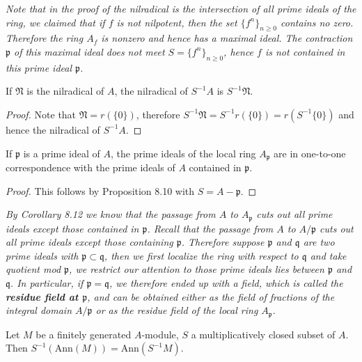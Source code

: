 \begin{note}\em
Note that in the proof of the nilradical is the intersection of all prime ideals of the ring, we claimed that if $f$ is not nilpotent, then the set $\{f^n\}_{n\ge 0}$ contains no zero. Therefore the ring $A_f$ is nonzero and hence has a maximal ideal. The contraction $\mathfrak{p}$ of this maximal ideal does not meet $S=\{f^n\}_{n\ge 0}$, hence $f$ is not contained in this prime ideal $\mathfrak{p}$.
\end{note}
\begin{corollary}
If $\mathfrak{N}$ is the nilradical of $A$, the nilradical of $S^{-1}A$ is $S^{-1}\mathfrak{N}$.
\end{corollary}
\begin{proof}
Note that $\mathfrak{N}=r(\{0\})$, therefore $S^{-1}\mathfrak{N}=S^{-1}r(\{0\})=r(S^{-1}\{0\})$ and hence the nilradical of $S^{-1}A$.
\end{proof}
\begin{corollary}
If $\mathfrak{p}$ is a prime ideal of $A$, the prime ideals of the local ring $A_\mathfrak{p}$ are in one-to-one correspondence with the prime ideals of $A$ contained in $\mathfrak{p}$.
\end{corollary}
\begin{proof}
This follows by Proposition 8.10 with $S=A-\mathfrak{p}$.
\end{proof}
\begin{note}\em
By Corollary 8.12 we know that the passage from $A$ to $A_\mathfrak{p}$ cuts out all prime ideals except those contained in $\mathfrak{p}$. Recall that the passage from $A$ to $A/\mathfrak{p}$ cuts out all prime ideals except those containing $\mathfrak{p}$. Therefore suppose $\mathfrak{p}$ and $\mathfrak{q}$ are two prime ideals with $\mathfrak{p}\subset\mathfrak{q}$, then we first localize the ring with respect to $\mathfrak{q}$ and take quotient mod $\mathfrak{p}$, we restrict our attention to those prime ideals lies between $\mathfrak{p}$ and $\mathfrak{q}$. In particular, if $\mathfrak{p}=\mathfrak{q}$, we therefore ended up with a field, which is called the \textbf{residue field at $\mathfrak{p}$}, and can be obtained either as the field of fractions of the integral domain $A/\mathfrak{p}$ or as the residue field of the local ring $A_\mathfrak{p}$.
\end{note}
\begin{proposition}
Let $M$ be a finitely generated $A$-module, $S$ a multiplicatively closed subset of $A$. Then $S^{-1}(\mathrm{Ann}(M))=\mathrm{Ann}(S^{-1}M)$.
\end{proposition}
